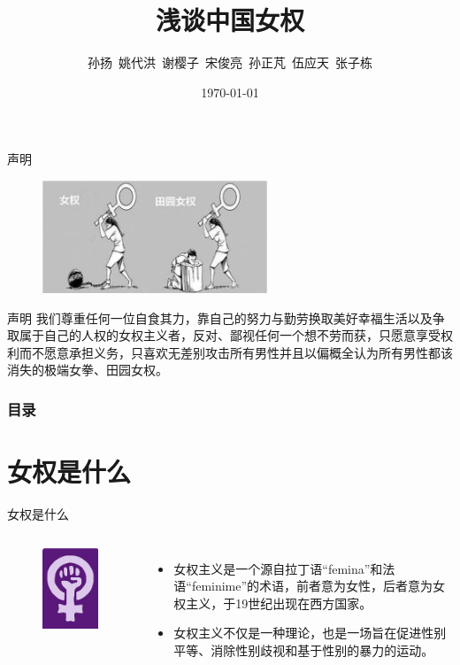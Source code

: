 \documentclass{beamer}
\author[]{孙扬~姚代洪~谢樱子~宋俊亮~孙正芃~伍应天~张子栋}
\title[浅谈中国女权]{浅谈中国女权}
\institute[]{华中农业大学
	
	信息学院}
\date[\today]{\today}
\begin{document}
	\kaishu
	
	\frame{\titlepage}
	
	\begin{frame}{声明}
		\begin{figure}
			\centering
			\includegraphics[width=0.6\textwidth]{img/IMG_20230530_210751.png}
		\end{figure}

		\begin{alertblock}{声明}
			我们尊重任何一位自食其力，靠自己的努力与勤劳换取美好幸福生活以及争取属于自己的人权的女权主义者，反对、鄙视任何一个想不劳而获，只愿意享受权利而不愿意承担义务，只喜欢无差别攻击所有男性并且以偏概全认为所有男性都该消失的极端女拳、田园女权。
		\end{alertblock}
	\end{frame}

	\begin{frame}
		\frametitle{目录}
		\tableofcontents
	\end{frame}
	
	\section{女权是什么}
	\begin{frame}{女权是什么}
		\begin{columns}
			\column{0.4\textwidth}
			\begin{figure}
				\centering
				\includegraphics{img/图片1.png}
			\end{figure}

			\column{0.6\textwidth}
			\begin{itemize}
				\item 女权主义是一个源自拉丁语“femina”和法语“feminime”的术语，前者意为女性，后者意为女权主义，于19世纪出现在西方国家。
				\item 女权主义不仅是一种理论，也是一场旨在促进性别平等、消除性别歧视和基于性别的暴力的运动。
				
			\end{itemize}
		\end{columns}
	\end{frame}
\end{document}
